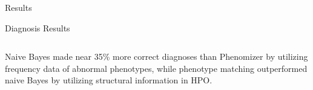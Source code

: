 \documentclass[final]{beamer} %
\begin{document}
\begin{frame}{}
\begin{columns}[T]
\begin{column}{0.3\linewidth}
\begin{block}{\Huge Results}
\begin{block}{\Large Diagnosis Results}
   \vspace{0.5cm}
   \begin{columns}
   \begin{column}{.7\textwidth}
   \large
   Naive Bayes made near 35\% more correct diagnoses than Phenomizer by utilizing frequency data of abnormal phenotypes, while phenotype matching outperformed naive Bayes by utilizing structural information in HPO. 
  \end{column}
  \end{columns}

      \end{block}
    \end{block}
    \end{column}
    \end{columns}
  \end{frame}
  
\end{document}
